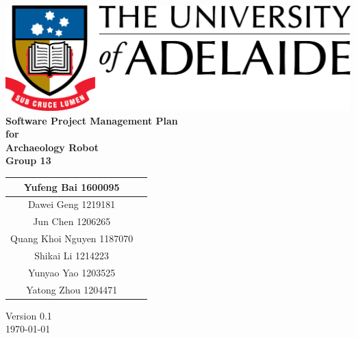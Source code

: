 \begin{center}
\includegraphics[scale=1.5]{./UniLogo}\\[1cm]    
\textbf{\Huge \bfseries Software Project Management Plan}\\[1.5cm]
\textbf{\huge for}\\[0.5cm]


\textbf{ \huge Archaeology Robot }\\[0.3cm]
\textbf{ \huge Group 13 }\\[2cm]


\begin{tabular}{ |c | p{2cm} |}
	\hline
Yufeng Bai 1600095 & \\[.5cm] \hline
Dawei Geng 1219181 & \\[.5cm] \hline
Jun Chen 1206265 & \\[.5cm] \hline
Quang Khoi Nguyen 1187070  & \\[.5cm] \hline
Shikai Li 1214223 & \\[.5cm] \hline
Yunyao Yao 1203525 & \\[.5cm] \hline
Yatong Zhou 1204471 & \\[.5cm] \hline
\end{tabular}


\vfill

Version 0.1 \\ [0.2cm]
{\large \today}

\end{center}

